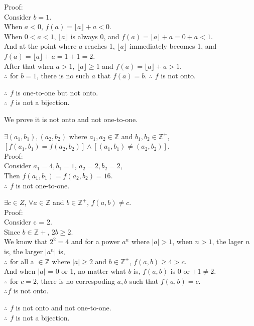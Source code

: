 \documentclass[12pt]{exam}
\begin{document}
\begin{solution}
\begin{qparts}
\begin{subparts}
            Proof:\\
            Consider $b = 1$.\\
            When $a < 0$, $f(a) = \lfloor a \rfloor + a < 0$.\\
            When $0 < a < 1$, $\lfloor a \rfloor$ is always $0$, and $f(a) = \lfloor a \rfloor + a = 0 + a <1$.\\
            And at the point where $a$ reaches 1, $\lfloor a \rfloor$ immediately becomes 1, and $f(a) = \lfloor a \rfloor + a = 1 + 1 = 2$.\\
            After that when $a > 1$, $\lfloor a \rfloor \geq 1$ and $f(a) = \lfloor a \rfloor + a >1$.\\
            $\therefore$ for $b = 1$, there is no such $a$ that $f(a) = b$.
            $\therefore$ $f$ is not onto.
        \end{subparts}
        $\therefore$ $f$ is one-to-one but not onto.\\
        $\therefore$ $f$ is not a bijection.
        \item
        We prove it is not onto and not one-to-one.
        \begin{subparts}
            \item
            $\exists (a_1, b_1), (a_2, b_2)$ where $a_1, a_2 \in \mathbb{Z}$ 
            and $b_1, b_2\in\mathbb{Z^+}$, $[f(a_1, b_1) = f(a_2, b_2)] \land [(a_1,b_1) \not = (a_2, b_2)]$.\\
            Proof:\\
            Consider $a_1 = 4, b_1 =1$, $a_2 = 2, b_2 = 2$,\\
            Then $f(a_1,b_1) = f(a_2, b_2) = 16$.\\
            $\therefore$ $f$ is not one-to-one.
            \item
            $\exists c\in Z$, $\forall a \in \mathbb{Z}$ and $b \in \mathbb{Z^+}$, $f(a,b) \not = c$.\\
            Proof:\\
            Consider c = 2.\\
            Since $b \in \mathbb{Z+}$, $2b \geq 2$.\\
            We know that $2^2 = 4$
            and for a power $a^n$ where $|a| > 1$, when $n > 1$, the lager $n$ is, the larger $|a^n|$ is,\\
            $\therefore$ for all a $\in \mathbb{Z}$ where $|a| \geq 2$ and $b \in \mathbb{Z^+}$, $f(a,b) \geq 4 > c$.\\
            And when $|a|$ = 0 or 1, no matter what $b$ is, $f(a,b)$ is $0$ or $\pm1 \not = 2$.\\
            $\therefore$ for $c =2$, there is no correspoding $a,b$ such that $f(a,b) = c$.\\
            $\therefore f$ is not onto.
        \end{subparts}
        $\therefore$ $f$ is not onto and not one-to-one.\\
        $\therefore$ $f$ is not a bijection.
    \end{qparts}

\end{solution}
\end{document}
